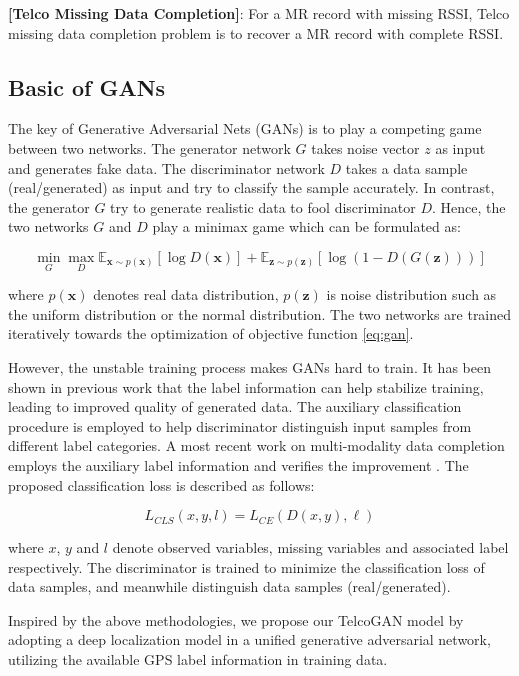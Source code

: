 \begin{problem}\label{prob:miss}
  \textbf{[Telco Missing Data Completion]}: For a MR record with missing RSSI, Telco missing data completion problem is to recover a MR record with complete RSSI.
\end{problem}


\subsection{Basic of GANs}
The key of Generative Adversarial Nets (GANs) \cite{DBLP:conf/nips/GoodfellowPMXWOCB14} is to play a competing game between two networks. The generator network $G$ takes noise vector $z$ as input and generates fake data. The discriminator network $D$ takes a data sample (real/generated) as input and try to classify the sample accurately. In contrast, the generator $G$ try to generate realistic data to fool discriminator $D$. Hence, the two networks $G$ and $D$ play a minimax game which can be formulated as:

\begin{equation}\label{eq:gan}
  \min\limits_G \max\limits_D \mathbb{E}_{\textbf{x}\sim p(\textbf{x})}[\log D(\textbf{x})]+\mathbb{E}_{\textbf{z}\sim p( \textbf{z})}[\log(1-D(G(\textbf{z})))]
\end{equation}

where $p(\textbf{x})$ denotes real data distribution, $p(\textbf{z})$ is noise distribution such as the uniform distribution or the normal distribution. The two networks are trained iteratively towards the optimization of objective function \ref{eq:gan}.

However, the unstable training process makes GANs hard to train. It has been shown in previous work \cite{DBLP:conf/icml/OdenaOS17} that the label information can help stabilize training, leading to improved quality of generated data. The auxiliary classification procedure is employed to help discriminator distinguish input samples from different label categories. A most recent work on multi-modality data completion employs the auxiliary label information and verifies the improvement \cite{DBLP:conf/kdd/CaiWGSJ18}. The proposed classification loss is described as follows:

\begin{equation}\label{eq:multi}
  L_{CLS}(x, y, l)=L_{CE}(D(x,y),\ell)
\end{equation}

where $x$, $y$ and $l$ denote observed variables, missing variables and associated label respectively. The discriminator is trained to minimize the classification loss of data samples, and meanwhile distinguish data samples (real/generated).

Inspired by the above methodologies, we propose our TelcoGAN model by adopting a deep localization model in a unified generative adversarial network, utilizing the available GPS label information in training data.
